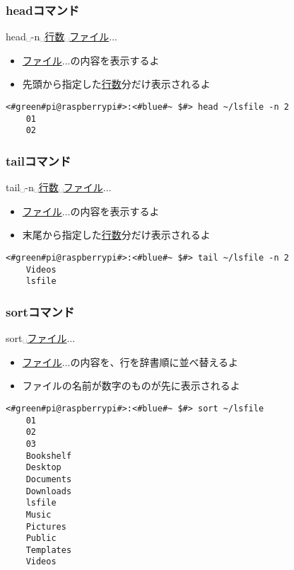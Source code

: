 \begin{frame}[fragile]
    \frametitle{headコマンド}
    head␣-n␣\underline{行数}␣\underline{ファイル}$\ldots$
    \begin{itemize}
        \item \underline{ファイル}$\ldots$の内容を表示するよ
        \item 先頭から指定した\underline{行数}分だけ表示されるよ
    \end{itemize}
    \begin{lstlisting}[title=headコマンドの実行例, label=shuf_example]
    <#green#pi@raspberrypi#>:<#blue#~ $#> head ~/lsfile -n 2
    01
    02
    \end{lstlisting}
\end{frame}

\begin{frame}[fragile]
    \frametitle{tailコマンド}
    tail␣-n␣\underline{行数}␣\underline{ファイル}$\ldots$
    \begin{itemize}
        \item \underline{ファイル}$\ldots$の内容を表示するよ
        \item 末尾から指定した\underline{行数}分だけ表示されるよ
    \end{itemize}
    \begin{lstlisting}[title=tailコマンドの実行例, label=shuf_example]
    <#green#pi@raspberrypi#>:<#blue#~ $#> tail ~/lsfile -n 2
    Videos
    lsfile
    \end{lstlisting}
\end{frame}

\begin{frame}[fragile]
    \frametitle{sortコマンド}
    sort␣\underline{ファイル}$\ldots$
    \begin{itemize}
        \item \underline{ファイル}$\ldots$の内容を、行を辞書順に並べ替えるよ
        \item ファイルの名前が数字のものが先に表示されるよ
    \end{itemize}
    \begin{lstlisting}[title=sortコマンドの実行例, label=sort_example]
    <#green#pi@raspberrypi#>:<#blue#~ $#> sort ~/lsfile
    01
    02
    03
    Bookshelf
    Desktop
    Documents
    Downloads
    lsfile
    Music
    Pictures
    Public
    Templates
    Videos
    \end{lstlisting}
\end{frame}

